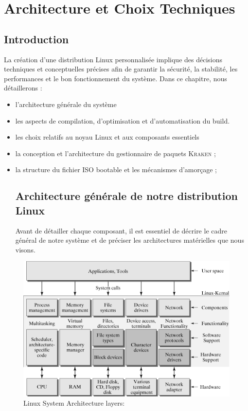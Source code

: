 \chapter{Architecture et Choix Techniques}
\clearpage
\label{sec:organisme}

\section{Introduction}
La création d'une distribution Linux personnalisée implique des décisions techniques et conceptuelles précises afin de garantir la sécurité, la stabilité, les performances et le bon fonctionnement du système. Dans ce chapitre, nous détaillerons :

\begin{itemize}
  \item l'architecture générale du système 
  \item les aspects de compilation, d’optimisation et d’automatisation du build.
  \item les choix relatifs au noyau Linux et aux composants essentiels 
  \item la conception et l'architecture du gestionnaire de paquets \textsc{Kraken} ;
  \item la structure du fichier ISO bootable et les mécanismes d’amorçage ;
 


\section{Architecture générale de notre distribution Linux}
Avant de détailler chaque composant, il est essentiel de décrire le cadre général de notre système et de préciser les architectures matérielles que nous visons.
\end{itemize}
\begin{figure}[htbp]
    \centering
    \includegraphics[width=1\textwidth]{images_pfe/linuxarchi.png}
    \caption{Linux System Architecture layers:}
    \label{fig:fhs}
\end{figure}


